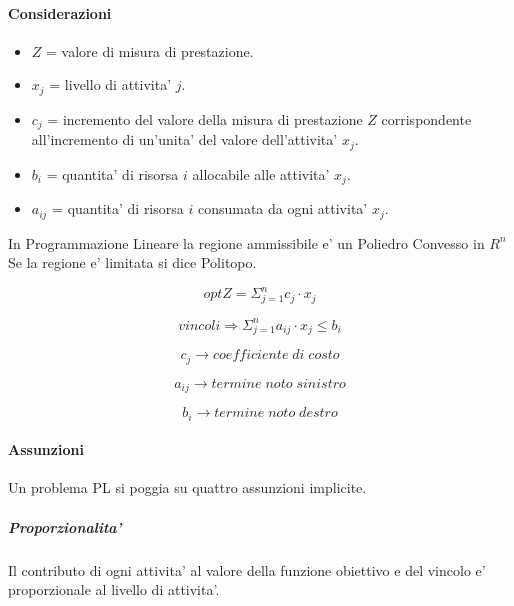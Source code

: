 \paragraph{Considerazioni}

\begin{itemize}
    \item $Z$ = valore di misura di prestazione.
    \item $x_j$ = livello di attivita' $j$.
    \item $c_j$ = incremento del valore della misura di prestazione $Z$ corrispondente all'incremento di un'unita' del valore dell'attivita' $x_j$.
    \item $b_i$ = quantita' di risorsa $i$ allocabile alle attivita' $x_j$.
    \item $a_{ij}$ = quantita' di risorsa $i$ consumata da ogni attivita' $x_j$.
\end{itemize}

In Programmazione Lineare la regione ammissibile e' un Poliedro Convesso in $R^n$
Se la regione e' limitata si dice Politopo.

\begin{equation}
    opt Z = \Sigma _ {j=1} ^ {n} c_j \cdot x_j
\end{equation}

\begin{equation}
    vincoli \Rightarrow \Sigma _ {j=1} ^ {n} a_{ij} \cdot x_j \leq b_i
\end{equation}

\begin{equation}
    c_{j} \rightarrow coefficiente \; di \; costo
\end{equation}

\begin{equation}
    a_{ij} \rightarrow termine \; noto \; sinistro
\end{equation}

\begin{equation}
    b_{i} \rightarrow termine \; noto \; destro
\end{equation}

\paragraph{Assunzioni}
Un problema PL si poggia su quattro assunzioni implicite.

\subparagraph{Proporzionalita'}
Il contributo di ogni attivita' al valore della funzione obiettivo e del vincolo e' proporzionale al livello di attivita'.

